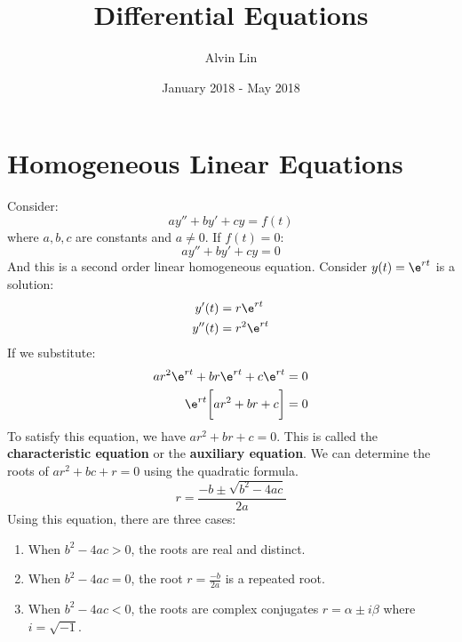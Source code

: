 \documentclass{math}
\title{Differential Equations}
\author{Alvin Lin}
\date{January 2018 - May 2018}
\begin{document}
\maketitle

\section*{Homogeneous Linear Equations}
Consider:
\[ ay''+by'+cy = f(t) \]
where \( a,b,c \) are constants and \( a \ne 0 \). If \( f(t) = 0 \):
\[ ay''+by'+cy = 0 \]
And this is a second order linear homogeneous equation. Consider \( y(t) =
\e^{rt} \) is a solution:
\begin{align*}
  y'(t) &= r\e^{rt} \\
  y''(t) &= r^2\e^{rt}
\end{align*}
If we substitute:
\begin{align*}
  ar^2\e^{rt}+br\e^{rt}+c\e^{rt} &= 0 \\
  \e^{rt}\bigg[ar^2+br+c\bigg] &= 0
\end{align*}
To satisfy this equation, we have \( ar^2+br+c = 0 \). This is called the
\textbf{characteristic equation} or the \textbf{auxiliary equation}. We can
determine the roots of \( ar^2+bc+r = 0 \) using the quadratic formula.
\[ r = \frac{-b\pm\sqrt{b^2-4ac}}{2a} \]
Using this equation, there are three cases:
\begin{enumerate}
  \item When \( b^2-4ac > 0 \), the roots are real and distinct.
  \item When \( b^2-4ac = 0 \), the root \( r = \frac{-b}{2a} \) is a repeated
  root.
  \item When \( b^2-4ac < 0 \), the roots are complex conjugates \( r = \alpha
  \pm i\beta \) where \( i = \sqrt{-1} \).
\end{enumerate}
\end{document}
